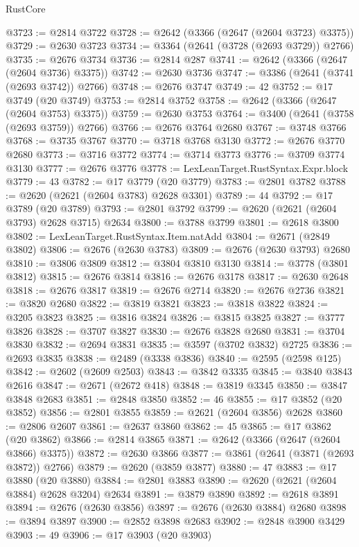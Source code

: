 \begin{lexlean}{RustCore}
\begin{coremodule}
@3723 := @2814 @3722
@3728 := @2642 (@3366 (@2647 (@2604 @3723) @3375))
@3729 := @2630 @3723
@3734 := @3364 (@2641 (@3728 (@2693 @3729)) @2766)
@3735 := @2676 @3734
@3736 := @2814 @287
@3741 := @2642 (@3366 (@2647 (@2604 @3736) @3375))
@3742 := @2630 @3736
@3747 := @3386 (@2641 (@3741 (@2693 @3742)) @2766)
@3748 := @2676 @3747
@3749 := 42
@3752 := @17 @3749 (@20 @3749)
@3753 := @2814 @3752
@3758 := @2642 (@3366 (@2647 (@2604 @3753) @3375))
@3759 := @2630 @3753
@3764 := @3400 (@2641 (@3758 (@2693 @3759)) @2766)
@3766 := @2676 @3764 @2680
@3767 := @3748 @3766
@3768 := @3735 @3767
@3770 := @3718 @3768 @3130
@3772 := @2676 @3770 @2680
@3773 := @3716 @3772
@3774 := @3714 @3773
@3776 := @3709 @3774 @3130
@3777 := @2676 @3776
@3778 := LexLeanTarget.RustSyntax.Expr.block
@3779 := 43
@3782 := @17 @3779 (@20 @3779)
@3783 := @2801 @3782
@3788 := @2620 (@2621 (@2604 @3783) @2628 @3301)
@3789 := 44
@3792 := @17 @3789 (@20 @3789)
@3793 := @2801 @3792
@3799 := @2620 (@2621 (@2604 @3793) @2628 @3715) @2634
@3800 := @3788 @3799
@3801 := @2618 @3800
@3802 := LexLeanTarget.RustSyntax.Item.natAdd
@3804 := @2671 (@2849 @3802)
@3806 := @2676 (@2630 @3783)
@3809 := @2676 (@2630 @3793) @2680
@3810 := @3806 @3809
@3812 := @3804 @3810 @3130
@3814 := @3778 (@3801 @3812)
@3815 := @2676 @3814
@3816 := @2676 @3178
@3817 := @2630 @2648
@3818 := @2676 @3817
@3819 := @2676 @2714
@3820 := @2676 @2736
@3821 := @3820 @2680
@3822 := @3819 @3821
@3823 := @3818 @3822
@3824 := @3205 @3823
@3825 := @3816 @3824
@3826 := @3815 @3825
@3827 := @3777 @3826
@3828 := @3707 @3827
@3830 := @2676 @3828 @2680
@3831 := @3704 @3830
@3832 := @2694 @3831
@3835 := @3597 (@3702 @3832) @2725
@3836 := @2693 @3835
@3838 := @2489 (@3338 @3836)
@3840 := @2595 (@2598 @125)
@3842 := @2602 (@2609 @2503)
@3843 := @3842 @3335
@3845 := @3840 @3843 @2616
@3847 := @2671 (@2672 @418)
@3848 := @3819 @3345
@3850 := @3847 @3848 @2683
@3851 := @2848 @3850
@3852 := 46
@3855 := @17 @3852 (@20 @3852)
@3856 := @2801 @3855
@3859 := @2621 (@2604 @3856) @2628
@3860 := @2806 @2607
@3861 := @2637 @3860
@3862 := 45
@3865 := @17 @3862 (@20 @3862)
@3866 := @2814 @3865
@3871 := @2642 (@3366 (@2647 (@2604 @3866) @3375))
@3872 := @2630 @3866
@3877 := @3861 (@2641 (@3871 (@2693 @3872)) @2766)
@3879 := @2620 (@3859 @3877)
@3880 := 47
@3883 := @17 @3880 (@20 @3880)
@3884 := @2801 @3883
@3890 := @2620 (@2621 (@2604 @3884) @2628 @3204) @2634
@3891 := @3879 @3890
@3892 := @2618 @3891
@3894 := @2676 (@2630 @3856)
@3897 := @2676 (@2630 @3884) @2680
@3898 := @3894 @3897
@3900 := @2852 @3898 @2683
@3902 := @2848 @3900 @3429
@3903 := 49
@3906 := @17 @3903 (@20 @3903)

\end{coremodule}
\end{lexlean}
